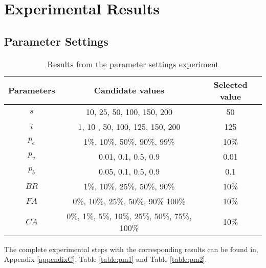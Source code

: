 \section{Experimental Results}


\subsection{Parameter Settings}
\label{subsec:parameterSettings_results}

	\begin{table}[H]
	\centering
    \begin{tabular}{|c|c||c|}
 	\hline
 	Parameters & Candidate values & Selected value\\
 	\hline
    $s$ & 10, 25, 50, 100, 150, 200 & 50 \\
    $i$ & 1, 10 , 50, 100, 125, 150, 200 & 125 \\
    $p_{e}$ & 1\%, 10\%, 50\%, 90\%, 99\% & 10\% \\
    $p_{v}$ & 0.01, 0.1, 0.5, 0.9 & 0.01  \\
    $p_{b}$ & 0.05, 0.1, 0.5, 0.9 & 0.1 \\
    $BR$ & 1\%, 10\%, 25\%, 50\%, 90\% & 10\% \\
    $FA$ & 0\%, 10\%, 25\%, 50\%, 90\% 100\% & 10\% \\
    $CA$ & 0\%, 1\%, 5\%, 10\%, 25\%, 50\%, 75\%, 100\% & 10\% \\
	\hline
    \end{tabular}
    \caption {Results from the parameter settings experiment}
    The complete experimental steps with the corresponding results can be found in, Appendix \ref{appendixC}, Table \vref{table:pm1} and Table \vref{table:pm2}.
    \label{table:parameterSettings2}
	\end{table}

